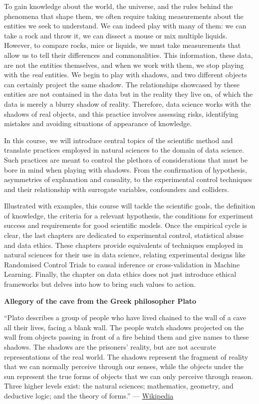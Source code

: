 \documentclass[
]{book}
\begin{document}
To gain knowledge about the world, the universe, and the rules behind the phenomena that shape them, we often require taking measurements about the entities we seek to understand. We can indeed play with many of them: we can take a rock and throw it, we can dissect a mouse or mix multiple liquids. However, to compare rocks, mice or liquids, we must take measurements that allow us to tell their differences and commonalities. This information, these data, are not the entities themselves, and when we work with them, we stop playing with the \emph{real} entities. We begin to play with shadows, and two different objects can certainly project the same shadow. The relationships showcased by these entities are not contained in the data but in the reality they live on, of which the data is merely a blurry shadow of reality. Therefore, data science works with the shadows of real objects, and this practice involves assessing risks, identifying mistakes and avoiding situations of appearance of knowledge.

In this course, we will introduce central topics of the scientific method and translate practices employed in natural sciences to the domain of data science. Such practices are meant to control the plethora of considerations that must be bore in mind when playing with shadows. From the confirmation of hypothesis, asymmetries of explanation and causality, to the experimental control techniques and their relationship with surrogate variables, confounders and colliders.

Illustrated with examples, this course will tackle the scientific goals, the definition of knowledge, the criteria for a relevant hypothesis, the conditions for experiment success and requirements for good scientific models. Once the empirical cycle is clear, the last chapters are dedicated to experimental control, statistical abuse and data ethics. These chapters provide equivalents of techniques employed in natural sciences for their use in data science, relating experimental designs like Randomised Control Trials to causal inference or cross-validation in Machine Learning. Finally, the chapter on data ethics does not just introduce ethical frameworks but delves into how to bring such values to action.

\begin{tipbox}

\textbf{Allegory of the cave from the Greek philosopher Plato}

``Plato describes a group of people who have lived chained to the wall of a cave all their lives, facing a blank wall. The people watch shadows projected on the wall from objects passing in front of a fire behind them and give names to these shadows. The shadows are the prisoners' reality, but are not accurate representations of the real world. The shadows represent the fragment of reality that we can normally perceive through our senses, while the objects under the sun represent the true forms of objects that we can only perceive through reason. Three higher levels exist: the natural sciences; mathematics, geometry, and deductive logic; and the theory of forms.'' --- \href{https://en.wikipedia.org/wiki/Allegory_of_the_cave}{Wikipedia}

\end{tipbox}
\end{document}
